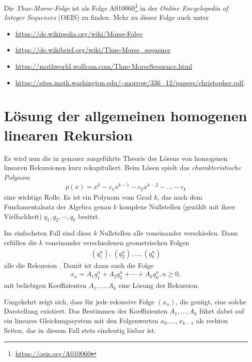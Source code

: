 \documentclass[11pt,a4paper]{article}
\begin{document}
Die \emph{Thue-Morse-Folge} ist als Folge
A010060\footnote{\url{https://oeis.org/A010060}} in der \emph{Online
Encyclopedia of Integer Sequences} (OEIS) zu finden. Mehr zu dieser Folge auch
unter
\begin{itemize}
\item \url{https://de.wikipedia.org/wiki/Morse-Folge}
\item \url{https://de.wikibrief.org/wiki/Thue-Morse_sequence}
\item \url{https://mathworld.wolfram.com/Thue-MorseSequence.html}
\item 
  \url{https://sites.math.washington.edu/~morrow/336_12/papers/christopher.pdf}.
\end{itemize}

\section{Lösung der allgemeinen homogenen linearen Rekursion \rf[e-linrek]}

Es wird nun die in \cite{b-schueler} genauer ausgeführte Theorie des Lösens
von homogenen linearen Rekursionen \rf[e-linrek] kurz rekapituliert.  Beim
Lösen spielt das \emph{charakteristische Polynom}
\begin{gather*}
  p(x)=x^k-c_1 x^{k-1}-c_2 x^{k-2} - \dots -c_k
\end{gather*}
eine wichtige Rolle. Es ist ein Polynom vom Grad $k$, das nach dem
Fundamentalsatz der Algebra genau $k$ komplexe Nullstellen (gezählt mit ihrer
Vielfachheit) $q_1,q_2,\cdots,q_k$ besitzt.

Im einfachsten Fall sind diese $k$ Nullstellen alle voneinander verschieden.
Dann erfüllen die $k$ voneinander verschiedenen geometrischen Folgen
\begin{gather*}
(q_1^n),\, (q_2^n),\dots,(q_k^n)
\end{gather*}
alle die Rekursion \rf[e-linrek]. Damit ist dann auch die Folge
\begin{align}\label{e-allg}
x_n=A_1 q_1^n +A_2 q_2^n +\cdots  +A_k q_k^n, n\ge 0,
\end{align}
mit beliebigen Koeffizienten $A_1,\dots ,A_k$ eine Lösung der Rekursion.

Umgekehrt zeigt sich, dass für jede rekursive Folge $(x_n)$, die \rf[e-linrek]
genügt, eine solche Darstellung \rf[e-allg] existiert.  Das Bestimmen der
Koeffizienten $A_1,\dots,A_k$ führt dabei auf ein lineares Gleichungssystem
mit den Folgenwerten $x_0,\dots,x_{k-1}$ als rechten Seiten, das in diesem
Fall stets eindeutig lösbar ist.
\end{document}

